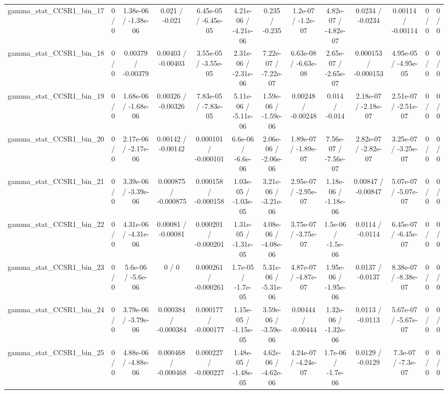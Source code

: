 \documentclass[10pt]{article}
\begin{document}
\begin{table}[htbp]
\begin{center}
\begin{tabular}{|c|c|c|c|c|c|c|c|c|c|c|c|c|}
  gamma_stat_CCSR1_bin_17 & 0 / 0 & 1.38e-06 / -1.38e-06 & 0.021 / -0.021 & 6.45e-05 / -6.45e-05 & 4.21e-06 / -4.21e-06 & 0.235 / -0.235 & 1.2e-07 / -1.2e-07 & 4.82e-07 / -4.82e-07 & 0.0234 / -0.0234 & 0.00114 / -0.00114 & 0 / 0 & 0 / 0 \\ 
  gamma_stat_CCSR1_bin_18 & 0 / 0 & 0.00379 / -0.00379 & 0.00403 / -0.00403 & 3.55e-05 / -3.55e-05 & 2.31e-06 / -2.31e-06 & 7.22e-07 / -7.22e-07 & 6.63e-08 / -6.63e-08 & 2.65e-07 / -2.65e-07 & 0.000153 / -0.000153 & 4.95e-05 / -4.95e-05 & 0 / 0 & 0 / 0 \\ 
  gamma_stat_CCSR1_bin_19 & 0 / 0 & 1.68e-06 / -1.68e-06 & 0.00326 / -0.00326 & 7.83e-05 / -7.83e-05 & 5.11e-06 / -5.11e-06 & 1.59e-06 / -1.59e-06 & 0.00248 / -0.00248 & 0.014 / -0.014 & 2.18e-07 / -2.18e-07 & 2.51e-07 / -2.51e-07 & 0 / 0 & 0 / 0 \\ 
  gamma_stat_CCSR1_bin_20 & 0 / 0 & 2.17e-06 / -2.17e-06 & 0.00142 / -0.00142 & 0.000101 / -0.000101 & 6.6e-06 / -6.6e-06 & 2.06e-06 / -2.06e-06 & 1.89e-07 / -1.89e-07 & 7.56e-07 / -7.56e-07 & 2.82e-07 / -2.82e-07 & 3.25e-07 / -3.25e-07 & 0 / 0 & 0 / 0 \\ 
  gamma_stat_CCSR1_bin_21 & 0 / 0 & 3.39e-06 / -3.39e-06 & 0.000875 / -0.000875 & 0.000158 / -0.000158 & 1.03e-05 / -1.03e-05 & 3.21e-06 / -3.21e-06 & 2.95e-07 / -2.95e-07 & 1.18e-06 / -1.18e-06 & 0.00847 / -0.00847 & 5.07e-07 / -5.07e-07 & 0 / 0 & 0 / 0 \\ 
  gamma_stat_CCSR1_bin_22 & 0 / 0 & 4.31e-06 / -4.31e-06 & 0.00081 / -0.00081 & 0.000201 / -0.000201 & 1.31e-05 / -1.31e-05 & 4.08e-06 / -4.08e-06 & 3.75e-07 / -3.75e-07 & 1.5e-06 / -1.5e-06 & 0.0114 / -0.0114 & 6.45e-07 / -6.45e-07 & 0 / 0 & 0 / 0 \\ 
  gamma_stat_CCSR1_bin_23 & 0 / 0 & 5.6e-06 / -5.6e-06 & 0 / 0 & 0.000261 / -0.000261 & 1.7e-05 / -1.7e-05 & 5.31e-06 / -5.31e-06 & 4.87e-07 / -4.87e-07 & 1.95e-06 / -1.95e-06 & 0.0137 / -0.0137 & 8.38e-07 / -8.38e-07 & 0 / 0 & 0 / 0 \\ 
  gamma_stat_CCSR1_bin_24 & 0 / 0 & 3.79e-06 / -3.79e-06 & 0.000384 / -0.000384 & 0.000177 / -0.000177 & 1.15e-05 / -1.15e-05 & 3.59e-06 / -3.59e-06 & 0.00444 / -0.00444 & 1.32e-06 / -1.32e-06 & 0.0113 / -0.0113 & 5.67e-07 / -5.67e-07 & 0 / 0 & 0 / 0 \\ 
  gamma_stat_CCSR1_bin_25 & 0 / 0 & 4.88e-06 / -4.88e-06 & 0.000468 / -0.000468 & 0.000227 / -0.000227 & 1.48e-05 / -1.48e-05 & 4.62e-06 / -4.62e-06 & 4.24e-07 / -4.24e-07 & 1.7e-06 / -1.7e-06 & 0.0129 / -0.0129 & 7.3e-07 / -7.3e-07 & 0 / 0 & 0 / 0 \\ 

\end{tabular}
\end{center}
\end{table}
\end{document}
